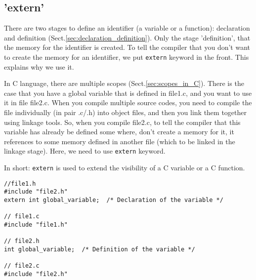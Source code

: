 \subsection{'extern'}
\label{sec:extern_C}

There are two stages to define an identifier (a variable or a function):
declaration and definition (Sect.\ref{sec:declaration_definition}).
Only the stage 'definition', that the memory for the identifier is created.
To tell the compiler that you don't want to create the memory for an identifier, 
we put \verb!extern! keyword in the front. This explains why we use it.

In C language, there are multiple scopes (Sect.\ref{sec:scopes_in_C}).
There is the case that you have a global variable that is defined in file1.c,
and you want to use it in file file2.c. When you compile multiple source codes,
you need to compile the file individually (in pair .c/.h) into object files, and
then you link them together using linkage tools. So, when you compile file2.c,
to tell the compiler that this variable has already be defined some where, don't
create a memory for it, it references to some memory defined in another file
(which to be linked in the linkage stage). Here, we need to use \verb!extern!
keyword.

In short: \verb!extern! is used to extend the visibility of a C variable or a C
function.
\begin{verbatim}
//file1.h
#include "file2.h"
extern int global_variable;  /* Declaration of the variable */

// file1.c
#include "file1.h"

// file2.h  
int global_variable;  /* Definition of the variable */

// file2.c
#include "file2.h"
\end{verbatim}


